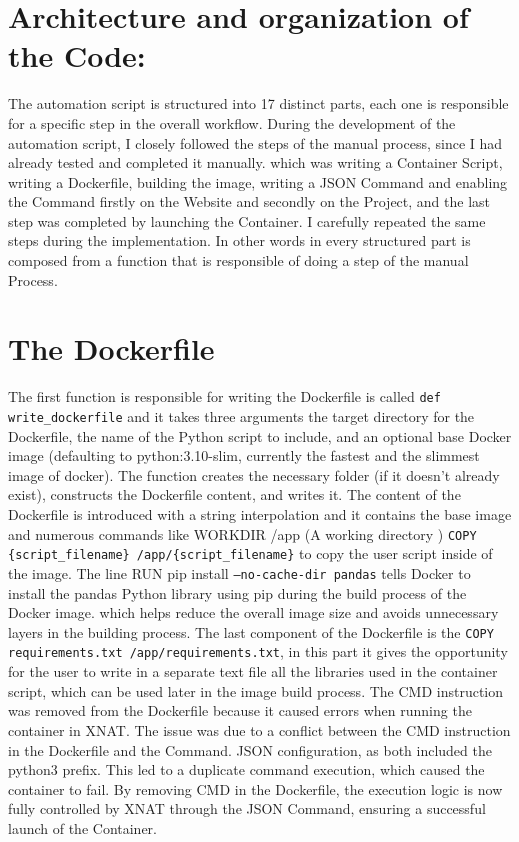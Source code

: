 \section{Architecture and organization of the Code:}
 The automation script is structured into 17 distinct parts, each one is  responsible for a specific step in the overall workflow.
 During the development of the automation script, I closely followed the steps of the manual process, since I had already tested and completed it manually. which was writing a Container Script, writing a Dockerfile, building the image, writing a JSON Command and enabling the Command firstly on the Website and secondly on the Project, and the last step was completed by launching the Container. I carefully repeated the same steps during the implementation. In other words in every structured part is composed from a function that is responsible of doing a step of the manual Process.
 
 \section{The Dockerfile}
 
The first function is responsible for writing the Dockerfile is called \texttt{def write\_dockerfile} and it takes three arguments the target directory for the Dockerfile, the name of the Python script to include, and an optional base Docker image (defaulting to python:3.10-slim, currently the fastest and the slimmest image of docker). The function creates the necessary folder (if it doesn't already exist), constructs the Dockerfile content, and writes it. The content of the Dockerfile is introduced with a string interpolation and it contains the base image and numerous commands like WORKDIR /app (A working directory ) \texttt{COPY \{script\_filename\} /app/\{script\_filename\}} to copy the user script inside of the image. The line  RUN pip install \texttt{--no-cache-dir pandas} tells Docker to install the pandas Python library using pip during the build process of the Docker image.  which helps reduce the overall image size and avoids unnecessary layers in the building process. The last component of the Dockerfile is the \texttt{COPY requirements.txt /app/requirements.txt}, in this part it gives the opportunity for the user to write in a separate text file all the libraries used in the container script, which can be used later in the image build process.
The CMD instruction was removed from the Dockerfile because it caused errors when running the container in XNAT. The issue was due to a conflict between the CMD instruction in the Dockerfile and the Command. JSON configuration, as both included the python3 prefix. This led to a duplicate command execution, which caused the container to fail. By removing CMD in the Dockerfile, the execution logic is now fully controlled by XNAT through the JSON Command, ensuring a successful launch of the Container.

